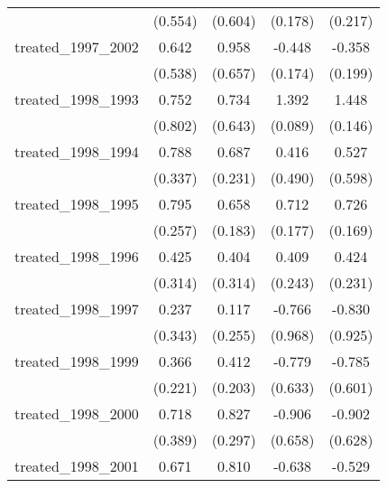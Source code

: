 {\begin{tabular}{l*{4}{c}}
            &     (0.554)         &     (0.604)         &     (0.178)         &     (0.217)         \\
[1em]
treated\_1997\_2002&       0.642         &       0.958         &      -0.448\sym{*}  &      -0.358         \\
            &     (0.538)         &     (0.657)         &     (0.174)         &     (0.199)         \\
[1em]
treated\_1998\_1993&       0.752         &       0.734         &       1.392\sym{***}&       1.448\sym{***}\\
            &     (0.802)         &     (0.643)         &     (0.089)         &     (0.146)         \\
[1em]
treated\_1998\_1994&       0.788\sym{*}  &       0.687\sym{**} &       0.416         &       0.527         \\
            &     (0.337)         &     (0.231)         &     (0.490)         &     (0.598)         \\
[1em]
treated\_1998\_1995&       0.795\sym{**} &       0.658\sym{***}&       0.712\sym{***}&       0.726\sym{***}\\
            &     (0.257)         &     (0.183)         &     (0.177)         &     (0.169)         \\
[1em]
treated\_1998\_1996&       0.425         &       0.404         &       0.409         &       0.424         \\
            &     (0.314)         &     (0.314)         &     (0.243)         &     (0.231)         \\
[1em]
treated\_1998\_1997&       0.237         &       0.117         &      -0.766         &      -0.830         \\
            &     (0.343)         &     (0.255)         &     (0.968)         &     (0.925)         \\
[1em]
treated\_1998\_1999&       0.366         &       0.412\sym{*}  &      -0.779         &      -0.785         \\
            &     (0.221)         &     (0.203)         &     (0.633)         &     (0.601)         \\
[1em]
treated\_1998\_2000&       0.718         &       0.827\sym{**} &      -0.906         &      -0.902         \\
            &     (0.389)         &     (0.297)         &     (0.658)         &     (0.628)         \\
[1em]
treated\_1998\_2001&       0.671         &       0.810\sym{*}  &      -0.638\sym{***}&      -0.529\sym{***}\\

\end{tabular}}
